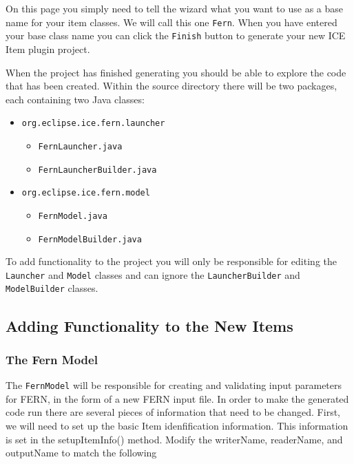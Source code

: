 On this page you simply need to tell the wizard what you want to use as a base
name for your item classes.  We will call this one \texttt{Fern}. 
When you have entered your base class name you can
click the \texttt{Finish} button to generate your new ICE Item plugin project.

When the project has finished generating you should be able to explore the code
that has been created.  Within the source directory there will be two packages,
each containing two Java classes:

\begin{itemize} 
    \item \texttt{org.eclipse.ice.fern.launcher} 
    \begin{itemize}
        \item \texttt{FernLauncher.java} 
        \item \texttt{FernLauncherBuilder.java}
    \end{itemize} 
    \item \texttt{org.eclipse.ice.fern.model} 
    \begin{itemize} 
        \item \texttt{FernModel.java} 
        \item \texttt{FernModelBuilder.java}
    \end{itemize} 
\end{itemize}

To add functionality to the project you will only be responsible for editing
the \texttt{Launcher} and \texttt{Model} classes and can ignore the
\texttt{LauncherBuilder} and \texttt{ModelBuilder} classes.


\subsection*{Adding Functionality to the New Items}

\subsubsection*{The Fern Model}

The \texttt{FernModel} will be responsible for creating and
validating input parameters for FERN, in the form of a new FERN input file.  In
order to make the generated code run there are several pieces of information that need to be changed.  First, we
will need to set up the basic Item idenfification information. This information
is set in the setupItemInfo() method. Modify the writerName, readerName, and
outputName to match the following

